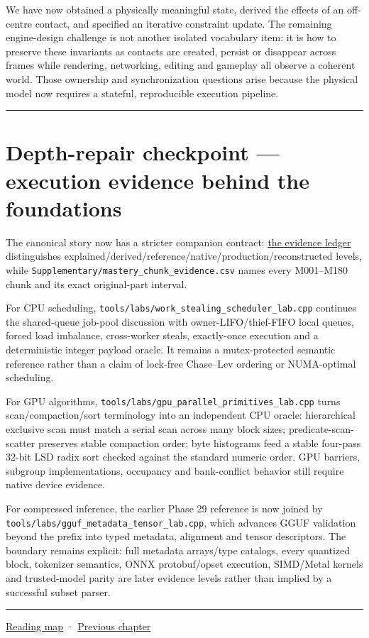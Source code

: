 We have now obtained a physically meaningful state, derived the effects of an off-centre contact, and specified an iterative constraint update. The remaining engine-design challenge is not another isolated vocabulary item: it is how to preserve these invariants as contacts are created, persist or disappear across frames while rendering, networking, editing and gameplay all observe a coherent world. Those ownership and synchronization questions arise because the physical model now requires a stateful, reproducible execution pipeline.

\begin{center}\rule{0.5\linewidth}{0.5pt}\end{center}

\section{Depth-repair checkpoint --- execution evidence behind the foundations}\label{02-foundations-ii-ch039-depth-repair-checkpoint-execution-evidence-behind-the-foundations}

The canonical story now has a stricter companion contract: \hyperref[appendix-2358b21a702d]{the evidence ledger} distinguishes explained/derived/reference/native/production/reconstructed levels, while \texttt{Supplementary/mastery\_chunk\_evidence.csv} names every M001--M180 chunk and its exact original-part interval.

For CPU scheduling, \texttt{tools/labs/work\_stealing\_scheduler\_lab.cpp} continues the shared-queue job-pool discussion with owner-LIFO/thief-FIFO local queues, forced load imbalance, cross-worker steals, exactly-once execution and a deterministic integer payload oracle. It remains a mutex-protected semantic reference rather than a claim of lock-free Chase--Lev ordering or NUMA-optimal scheduling.

For GPU algorithms, \texttt{tools/labs/gpu\_parallel\_primitives\_lab.cpp} turns scan/compaction/sort terminology into an independent CPU oracle: hierarchical exclusive scan must match a serial scan across many block sizes; predicate-scan-scatter preserves stable compaction order; byte histograms feed a stable four-pass 32-bit LSD radix sort checked against the standard numeric order. GPU barriers, subgroup implementations, occupancy and bank-conflict behavior still require native device evidence.

For compressed inference, the earlier Phase 29 reference is now joined by \texttt{tools/labs/gguf\_metadata\_tensor\_lab.cpp}, which advances GGUF validation beyond the prefix into typed metadata, alignment and tensor descriptors. The boundary remains explicit: full metadata arrays/type catalogs, every quantized block, tokenizer semantics, ONNX protobuf/opset execution, SIMD/Metal kernels and trusted-model parity are later evidence levels rather than implied by a successful subset parser.

\begin{center}\rule{0.5\linewidth}{0.5pt}\end{center}

\hyperref[volume-reading-map]{Reading map} · \hyperref[02-foundations-ii-ch038]{Previous chapter}
